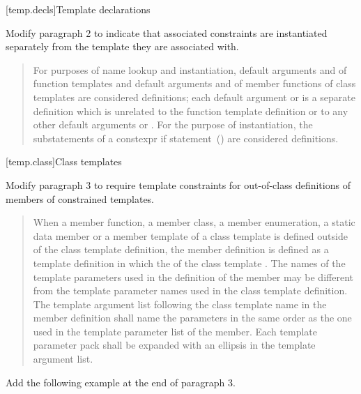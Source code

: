 \setcounter{section}{5}
[temp.decls]{Template declarations}

Modify paragraph 2 to indicate that associated constraints are
instantiated separately from the template they are associated with.

\begin{quote}
\setcounter{Paras}{1}
\pnum
For purposes of name lookup and instantiation,
default arguments and 
 of function templates and 
default arguments and 
 of member functions of class templates 
are considered definitions;
each default argument or 
 is a separate definition which is unrelated to
the function template definition or to any other default arguments or
.
For the purpose of instantiation, the substatements of a constexpr if
statement~() are considered definitions.
\end{quote}


[temp.class]{Class templates}

Modify paragraph 3 to require template constraints for out-of-class
definitions of members of constrained templates. 

\begin{quote}
\setcounter{Paras}{2}
\pnum
When a member function, a member class, a member enumeration, a static 
data member or a member template of a class template is defined outside 
of the class template definition, the member definition is defined as a 
template definition in which the
of the class template \added{(\ref{temp.over.link})}.
% 
The names of the template parameters used in the definition of the 
member may be different from the template parameter names used in the 
class template definition. The template argument list following the class
template name in the member definition shall name the parameters in the 
same order as the one used in the template parameter list of the member. 
% 
Each template parameter pack shall be expanded with an ellipsis in the 
template argument list.
\end{quote}

Add the following example at the end of paragraph 3.

